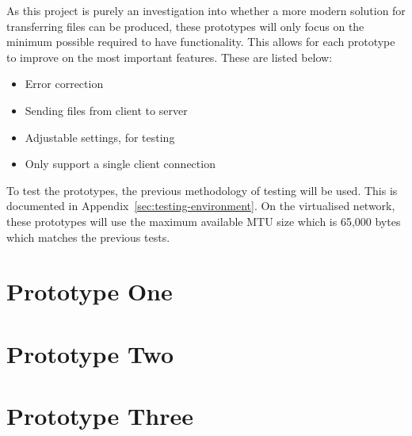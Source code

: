 As this project is purely an investigation into whether a more modern solution for transferring files can be produced, these prototypes will only focus on the minimum possible required to have functionality. This allows for each prototype to improve on the most important features. These are listed below:

\begin{itemize}
	\item Error correction
	\item Sending files from client to server
	\item Adjustable settings, for testing
	\item Only support a single client connection
\end{itemize}

To test the prototypes, the previous methodology of testing will be used. This is documented in Appendix~\ref{sec:testing-environment}. On the virtualised network, these prototypes will use the maximum available MTU size which is 65,000 bytes which matches the previous tests.

\newpage
\section{Prototype One}

\newpage
\section{Prototype Two}

\newpage
\section{Prototype Three}

